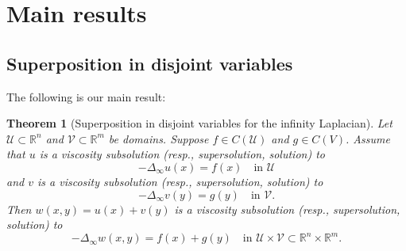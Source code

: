 \documentclass[12pt, reqno]{amsart}
\newtheorem{theorem}{Theorem}
\newcommand{\R}{\mathbb{R}}
\def\R{{\mathbb R}}
\def\U{{\mathcal U}}
\def\V{{\mathcal V}}
\begin{document}
\section{Main results}
\subsection{Superposition in disjoint variables}\label{main}
The following is our main result: 

\begin{theorem}[Superposition in disjoint variables for the infinity Laplacian]\label{infsuper}
 Let $\U\subset \mathbb{R}^n$ and $\V\subset \R^m$ be domains. Suppose $f\in C(\U)$ and $g\in C(V)$. Assume that $u$ is a viscosity subsolution (resp., supersolution, solution) to 
   \begin{equation}\label{u-inf}
   -\Delta_\infty u(x)=f(x)\quad \text{in $\U$}
   \end{equation}
    and $v$ is a viscosity subsolution (resp., supersolution, solution)  to 
   \begin{equation}\label{v-inf}
   -\Delta_\infty v(y)=g(y)\quad \text{in $\V$.}
   \end{equation}
Then $w(x,y)=u(x)+v(y)$ is a viscosity subsolution (resp., supersolution, solution) to 
   \begin{equation}\label{w-inf}
   -\Delta_\infty w(x, y)=f(x)+g(y) \quad \text{in $\U\times \V\subset \mathbb{R}^n\times \mathbb{R}^m$.}
   \end{equation}    

\end{theorem}
\end{document}
